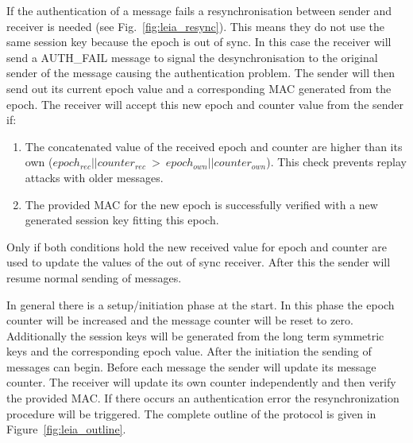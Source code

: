 \smallskip
If the authentication of a message fails a resynchronisation between sender and
receiver is needed (see Fig.~\ref{fig:leia_resync}). This means they do not use
the same session key because the epoch is out of sync. In this case the receiver
will send a AUTH\_FAIL message to signal the desynchronisation to the original
sender of the message causing the authentication problem. The sender will then
send out its current epoch value and a corresponding MAC generated from the
epoch. The receiver will accept this new epoch and counter value from the sender
if:

\begin{enumerate}
    \item The concatenated value of the received epoch and counter are higher
    than its own ($ epoch_{rec} || counter_{rec}~>~epoch_{own} || counter_{own}
    $). This check prevents replay attacks with older messages. 
    \item The provided MAC for the new epoch is successfully verified with a new
    generated session key fitting this epoch.
\end{enumerate}

Only if both conditions hold the new received value for epoch and counter are
used to update the values of the out of sync receiver. After this the sender
will resume normal sending of messages. 

In general there is a setup/initiation phase at the start. In this phase the
epoch counter will be increased and the message counter will be reset to zero.
Additionally the session keys will be generated from the long term symmetric
keys and the corresponding epoch value. After the initiation the sending of
messages can begin. Before each message the sender will update its message
counter. The receiver will update its own counter independently and then verify
the provided MAC. If there occurs an authentication error the resynchronization
procedure will be triggered. The complete outline of the protocol is given in
Figure~\ref{fig:leia_outline}.

